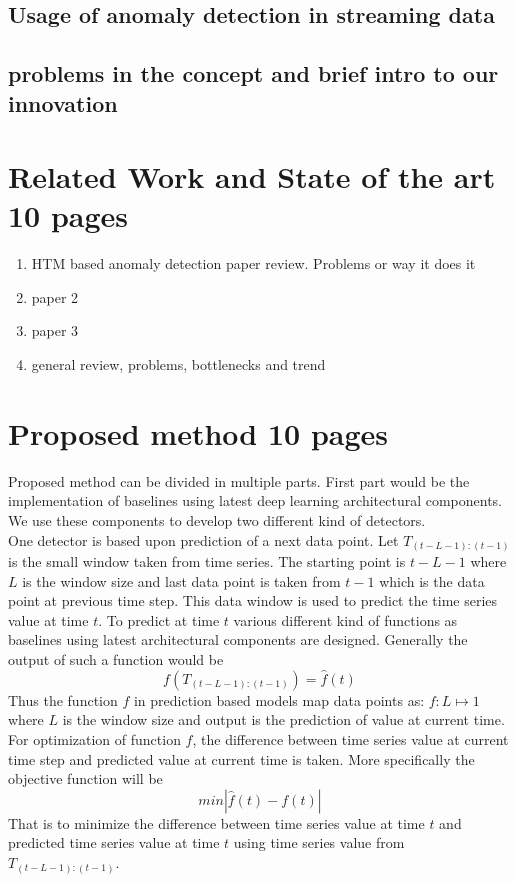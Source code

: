\documentclass[12pt]{article}
\begin{document}
\subsection{Usage of anomaly detection in streaming data}
\subsection{problems in the concept and brief intro to our innovation}
\newpage
\section{Related Work and State of the art 10 pages}
\begin{enumerate}
	\item HTM based anomaly detection paper review. Problems or way it does it
	\item paper 2
	\item paper 3
	\item general review, problems, bottlenecks and trend
\end{enumerate}
\newpage
\section{Proposed method 10 pages}
Proposed method can be divided in multiple parts. First part would be the implementation of baselines using latest deep learning architectural components. We use these components to develop two different kind of detectors.\\
One detector is based upon prediction of a next data point. Let $T_{(t-L-1):(t-1)}$ is the small window taken from time series. The starting point is $t-L-1$ where $L$ is the window size and last data point is taken from $t-1$ which is the data point at previous time step. This data window is used to predict the time series value at time $t$. To predict at time $t$ various different kind of functions as baselines using latest architectural components are designed. Generally the output of such a function would be
\begin{equation}
f(T_{(t-L-1):(t-1)}) = \hat{f}(t)
\end{equation} 
Thus the function $f$ in prediction based models map data points as: $f: L \mapsto 1$ where $L$ is the window size and output is the prediction of value at current time. For optimization of function $f$, the difference between time series value at current time step and predicted value at current time is taken. More specifically the objective function will be
\begin{equation}
min |\hat{f}(t) - f(t)|
\end{equation}
That is to minimize the difference between time series value at time $t$ and predicted time series value at time $t$ using time series value from $T_{(t-L-1):(t-1)}$.
\end{document}

